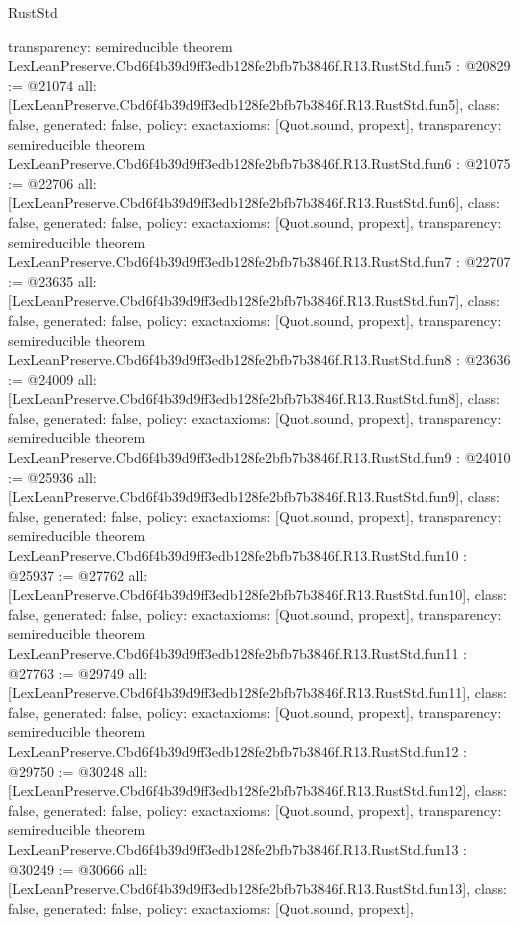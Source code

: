 \begin{lexlean}{RustStd}
\begin{coremodule}
{  transparency: semireducible
}
theorem LexLeanPreserve.Cbd6f4b39d9ff3edb128fe2bfb7b3846f.R13.RustStd.fun5 : @20829 := @21074 {
  all: [LexLeanPreserve.Cbd6f4b39d9ff3edb128fe2bfb7b3846f.R13.RustStd.fun5],
  class: false,
  generated: false,
  policy: exact{axioms: [Quot.sound, propext]},
  transparency: semireducible
}
theorem LexLeanPreserve.Cbd6f4b39d9ff3edb128fe2bfb7b3846f.R13.RustStd.fun6 : @21075 := @22706 {
  all: [LexLeanPreserve.Cbd6f4b39d9ff3edb128fe2bfb7b3846f.R13.RustStd.fun6],
  class: false,
  generated: false,
  policy: exact{axioms: [Quot.sound, propext]},
  transparency: semireducible
}
theorem LexLeanPreserve.Cbd6f4b39d9ff3edb128fe2bfb7b3846f.R13.RustStd.fun7 : @22707 := @23635 {
  all: [LexLeanPreserve.Cbd6f4b39d9ff3edb128fe2bfb7b3846f.R13.RustStd.fun7],
  class: false,
  generated: false,
  policy: exact{axioms: [Quot.sound, propext]},
  transparency: semireducible
}
theorem LexLeanPreserve.Cbd6f4b39d9ff3edb128fe2bfb7b3846f.R13.RustStd.fun8 : @23636 := @24009 {
  all: [LexLeanPreserve.Cbd6f4b39d9ff3edb128fe2bfb7b3846f.R13.RustStd.fun8],
  class: false,
  generated: false,
  policy: exact{axioms: [Quot.sound, propext]},
  transparency: semireducible
}
theorem LexLeanPreserve.Cbd6f4b39d9ff3edb128fe2bfb7b3846f.R13.RustStd.fun9 : @24010 := @25936 {
  all: [LexLeanPreserve.Cbd6f4b39d9ff3edb128fe2bfb7b3846f.R13.RustStd.fun9],
  class: false,
  generated: false,
  policy: exact{axioms: [Quot.sound, propext]},
  transparency: semireducible
}
theorem LexLeanPreserve.Cbd6f4b39d9ff3edb128fe2bfb7b3846f.R13.RustStd.fun10 : @25937 := @27762 {
  all: [LexLeanPreserve.Cbd6f4b39d9ff3edb128fe2bfb7b3846f.R13.RustStd.fun10],
  class: false,
  generated: false,
  policy: exact{axioms: [Quot.sound, propext]},
  transparency: semireducible
}
theorem LexLeanPreserve.Cbd6f4b39d9ff3edb128fe2bfb7b3846f.R13.RustStd.fun11 : @27763 := @29749 {
  all: [LexLeanPreserve.Cbd6f4b39d9ff3edb128fe2bfb7b3846f.R13.RustStd.fun11],
  class: false,
  generated: false,
  policy: exact{axioms: [Quot.sound, propext]},
  transparency: semireducible
}
theorem LexLeanPreserve.Cbd6f4b39d9ff3edb128fe2bfb7b3846f.R13.RustStd.fun12 : @29750 := @30248 {
  all: [LexLeanPreserve.Cbd6f4b39d9ff3edb128fe2bfb7b3846f.R13.RustStd.fun12],
  class: false,
  generated: false,
  policy: exact{axioms: [Quot.sound, propext]},
  transparency: semireducible
}
theorem LexLeanPreserve.Cbd6f4b39d9ff3edb128fe2bfb7b3846f.R13.RustStd.fun13 : @30249 := @30666 {
  all: [LexLeanPreserve.Cbd6f4b39d9ff3edb128fe2bfb7b3846f.R13.RustStd.fun13],
  class: false,
  generated: false,
  policy: exact{axioms: [Quot.sound, propext]},
}
\end{coremodule}
\end{lexlean}
